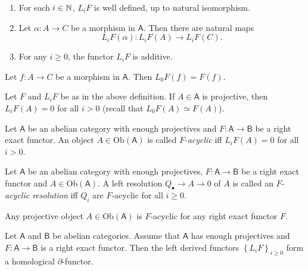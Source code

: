 \begin{lem}\leavevmode\vspace{-.2\baselineskip}
	\begin{enumerate}[label=(\alph*)]
		\item For each $i \in \mathbb{N}$, $L_i F$ is well defined, up to natural isomorphism.
		\item Let $\alpha\colon A \to C$ be a morphism in $\mathsf{A}$.
			Then there are natural maps
			\begin{equation}
				L_i F(\alpha)\colon L_iF(A) \to L_iF(C)
			.\end{equation} 
		\item For any $i \geq 0$, the functor $L_i F$ is additive.
	\end{enumerate}
\end{lem} 

\begin{lem}
	Let $f\colon A \to C$ be a morphism in $\mathsf{A}$.
	Then $L_0F(f) = F(f)$.
\end{lem} 

\begin{prop}
	Let $F$ and $L_i F$ be as in the above definition.
	If $A \in \mathsf{A}$ is projective, then $L_iF(A) = 0$
	for all $i > 0$ (recall that $L_0F(A) \simeq F(A)$).
\end{prop} 

\begin{defn}
	Let $\mathsf{A}$ be an abelian category with enough projectives
	and $F\colon\mathsf{A} \to \mathsf{B}$ be a right exact functor.
	An object $A \in \mathrm{Ob} \left(\mathsf{A}\right)$ is called
	$F$-{\em acyclic} iff $L_iF(A) = 0$ for all $i > 0$.
\end{defn}

\begin{defn}
	Let $\mathsf{A}$ be an abelian category with enough projectives,
	$F\colon\mathsf{A} \to \mathsf{B}$ be a right exact functor and $A \in \mathrm{Ob} \left(\mathsf{A}\right)$.
	A left resolution $Q_{\bullet} \to A \to 0$ of $A$ is called an
	$F$-{\em acyclic resolution} iff $Q_i$ are $F$-acyclic
	for all $i \geq 0$.	
\end{defn}

\begin{rem}[]
	Any projective object $A \in \mathrm{Ob} \left(\mathsf{A}\right)$ is $F$-acyclic
	for any right exact functor $F$.
\end{rem}

\begin{thm}[]
	Let $\mathsf{A}$ and $\mathsf{B}$ be abelian categories.
	Assume that $\mathsf{A}$ has enough projectives and $F\colon\mathsf{A} \to \mathsf{B}$
	is a right exact functor.
	Then the left derived functors $\left\{ L_i F \right\}_{i \geq 0}$
	form a homological $\partial$-functor.
\end{thm}

